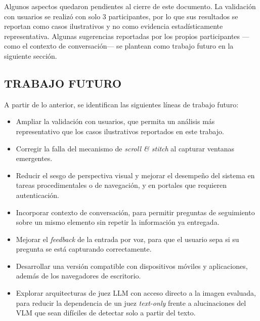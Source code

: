Algunos aspectos quedaron pendientes al cierre de este documento. La validación con usuarios se realizó con solo 3 participantes, por lo que sus resultados se reportan como casos ilustrativos y no como evidencia estadísticamente representativa. Algunas sugerencias reportadas por los propios participantes —como el contexto de conversación— se plantean como trabajo futuro en la siguiente sección.

\subsection{TRABAJO FUTURO}

A partir de lo anterior, se identifican las siguientes líneas de trabajo futuro:

\begin{itemize}
    \item Ampliar la validación con usuarios, que permita un análisis más representativo que los casos ilustrativos reportados en este trabajo.
    \item Corregir la falla del mecanismo de \textit{scroll \& stitch} al capturar ventanas emergentes.
    \item Reducir el sesgo de perspectiva visual y mejorar el desempeño del sistema en tareas procedimentales o de navegación, y en portales que requieren autenticación.
    \item Incorporar contexto de conversación, para permitir preguntas de seguimiento sobre un mismo elemento sin repetir la información ya entregada.
    \item Mejorar el \textit{feedback} de la entrada por voz, para que el usuario sepa si su pregunta se está capturando correctamente.
    \item Desarrollar una versión compatible con dispositivos móviles y aplicaciones, además de los navegadores de escritorio.
    \item Explorar arquitecturas de juez LLM con acceso directo a la imagen evaluada, para reducir la dependencia de un juez \textit{text-only} frente a alucinaciones del VLM que sean difíciles de detectar solo a partir del texto.
\end{itemize}
